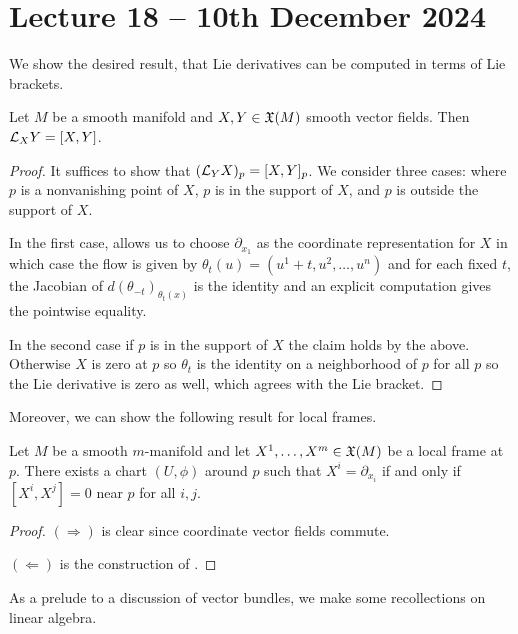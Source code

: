 \section{Lecture 18 -- 10th December 2024}\label{sec: lecture 18}
We show the desired result, that Lie derivatives can be computed in terms of Lie brackets. 
\begin{proposition}\label{prop: Lie derivatives as Lie brackets}
    Let $M$ be a smooth manifold and $X,Y\in\mathfrak{X}(M)$ smooth vector fields. Then $\mathcal{L}_{X}Y=[X,Y]$. 
\end{proposition}
\begin{proof}
    It suffices to show that $(\mathcal{L}_{Y}X)_{p}=[X,Y]_{p}$. We consider three cases: where $p$ is a nonvanishing point of $X$, $p$ is in the support of $X$, and $p$ is outside the support of $X$. 

    In the first case,  allows us to choose $\partial_{x_{1}}$ as the coordinate representation for $X$ in which case the flow is given by $\theta_{t}(u)=(u^{1}+t,u^{2},\dots,u^{n})$ and for each fixed $t$, the Jacobian of $d(\theta_{-t})_{\theta_{t}(x)}$ is the identity and an explicit computation gives the pointwise equality. 

    In the second case if $p$ is in the support of $X$ the claim holds by the above. Otherwise $X$ is zero at $p$ so $\theta_{t}$ is the identity on a neighborhood of $p$ for all $p$ so the Lie derivative is zero as well, which agrees with the Lie bracket. 
\end{proof}
Moreover, we can show the following result for local frames. 
\begin{theorem}\label{thm: local frame canonical form}
    Let $M$ be a smooth $m$-manifold and let $X^{1},\dots,X^{m}\in\mathfrak{X}(M)$ be a local frame at $p$. There exists a chart $(U,\phi)$ around $p$ such that $X^{i}=\partial_{x_{i}}$ if and only if $[X^{i},X^{j}]=0$ near $p$ for all $i,j$. 
\end{theorem}
\begin{proof}
    $(\Rightarrow)$ is clear since coordinate vector fields commute. 
    
    $(\Leftarrow)$ is the construction of .
\end{proof}
As a prelude to a discussion of vector bundles, we make some recollections on linear algebra. 

